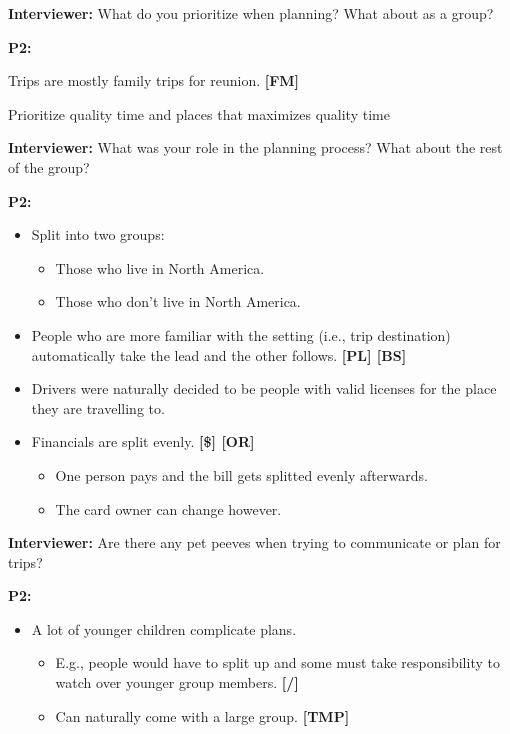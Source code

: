 \documentclass[12pt,a4paper]{article}
\begin{document}
\textbf{Interviewer: }What do you prioritize when planning? What about as a group?  

\textbf{P2: }

Trips are mostly family trips for reunion. \textbf{[FM]}

Prioritize quality time and places that maximizes quality time

\textbf{Interviewer: }What was your role in the planning process? What about the rest of the group? 

\textbf{P2: }

\begin{itemize}
    \item Split into two groups:
    \begin{itemize}
        \item Those who live in North America. 
        \item Those who don't live in North America. 
    \end{itemize}
    \item People who are more familiar with the setting (i.e., trip destination) automatically take the lead and the other follows. \textbf{[PL] [BS]}
    \item Drivers were naturally decided to be people with valid licenses for the place they are travelling to. 
    \item Financials are split evenly. \textbf{[\$] [OR]}
    \begin{itemize}
        \item One person pays and the bill gets splitted evenly afterwards. 
        \item The card owner can change however. 
    \end{itemize}
\end{itemize}

\textbf{Interviewer: }Are there any pet peeves when trying to communicate or plan for trips? 

\textbf{P2:}

\begin{itemize}
    \item A lot of younger children complicate plans. 
    \begin{itemize}
        \item E.g., people would have to split up and some must take responsibility to watch over younger group members. \textbf{[/]}
        \item Can naturally come with a large group. \textbf{[TMP]}
    \end{itemize}
\end{itemize}
\end{document}
